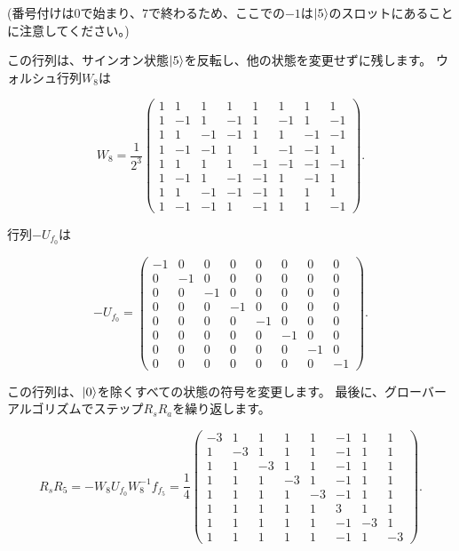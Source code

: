 (番号付けは$0$で始まり、$7$で終わるため、ここでの$-1$は$\ket{5}$のスロットにあることに注意してください。)

この行列は、サインオン状態$\ket{5}$を反転し、他の状態を変更せずに残します。 ウォルシュ行列$W_8$は

\begin{equation}
\label{89}
W_8
=
\frac{1}{2^3}
\left( \begin{array}{cccccccc}
1 & 1 & 1 & 1 & 1 & 1 & 1 & 1 \\
1 & -1 & 1 & -1 & 1 & -1 & 1 & -1 \\
1 & 1 & -1 & -1 & 1 & 1 & -1 & -1 \\
1 & -1 & -1 & 1 & 1 & -1 & -1 & 1 \\
1 & 1 & 1 & 1 & -1 & -1 & -1 & -1 \\
1 & -1 & 1 & -1 & -1 & 1 & -1 & 1 \\
1 & 1 & -1 & -1 & -1 & 1 & 1 & 1 \\
1 & -1 & -1 & 1 & -1 & 1 & 1 & -1 
\end{array} \right).
\end{equation}

行列$-U_{f_0}$は

\begin{equation}
\label{90}
-U_{f_0}
=
\left( \begin{array}{cccccccc}
-1 & 0 & 0 & 0 & 0 & 0 & 0 & 0 \\
0 & -1 & 0 & 0 & 0 & 0 & 0 & 0 \\
0 & 0 & -1 & 0 & 0 & 0 & 0 & 0 \\
0 & 0 & 0 & -1 & 0 & 0 & 0 & 0 \\
0 & 0 & 0 & 0 & -1 & 0 & 0 & 0 \\
0 & 0 & 0 & 0 & 0 & -1 & 0 & 0 \\
0 & 0 & 0 & 0 & 0 & 0 & -1 & 0 \\
0 & 0 & 0 & 0 & 0 & 0 & 0 & -1
\end{array} \right).
\end{equation}

この行列は、$\ket{0}$を除くすべての状態の符号を変更します。 最後に、グローバーアルゴリズムでステップ$R_s R_a$を繰り返します。

\begin{equation}
\label{91}
R_s R_5 
=
-W_8 U_{f_0} W_8^{-1} f_{f_5}
=
\frac{1}{4}
\left( \begin{array}{cccccccc}
-3 & 1 & 1 & 1 & 1 & -1 & 1 & 1 \\
1 & -3 & 1 & 1 & 1 & -1 & 1 & 1 \\
1 & 1 & -3 & 1 & 1 & -1 & 1 & 1 \\
1 & 1 & 1 & -3 & 1 & -1 & 1 & 1 \\
1 & 1 & 1 & 1 & -3 & -1 & 1 & 1 \\
1 & 1 & 1 & 1 & 1 & 3 & 1 & 1 \\
1 & 1 & 1 & 1 & 1 & -1 & -3 & 1 \\
1 & 1 & 1 & 1 & 1 & -1 & 1 & -3 
\end{array} \right).
\end{equation}

